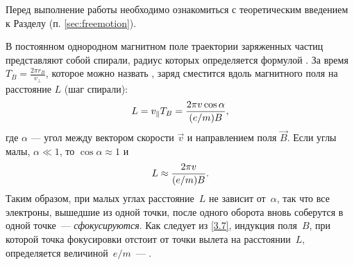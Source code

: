 


Перед выполнение работы необходимо ознакомиться с теоретическим введением
к Разделу (п. \ref{sec:freemotion}).


В постоянном однородном магнитном поле траектории заряженных частиц представляют
собой спирали, радиус которых определяется формулой .
За время $T_B= \frac{2\pi r_B}{v_{\perp}}$, которое можно назвать
, заряд сместится вдоль магнитного поля на 
расстояние $L$ (шаг спирали):
\begin{equation}
    \eqmark{3.6}
    L = v_{\parallel}T_B =\frac{2\pi v\cos\alpha}{(e/m)B},
\end{equation}
где $\alpha$ --- угол между вектором скорости $\vec{v}$ и направлением поля $\vec{B}$.
Если углы малы, $\alpha \ll 1$, то $\cos\alpha \approx 1$ и
\begin{equation}
    \eqmark{3.7}
    L \approx \frac{2\pi v}{(e/m)B}.
\end{equation}
Таким образом, при малых углах расстояние~$L$ не зависит от~$\alpha$, так
что все электроны, вышедшие из одной точки, после одного оборота вновь соберутся
в одной точке~--- \emph{сфокусируются}. Как следует из \eqref{3.7}, 
индукция поля~$B$, при которой точка фокусировки отстоит от точки вылета 
на расстоянии~$L$, определяется величиной~$e/m$~--- 
.

%

